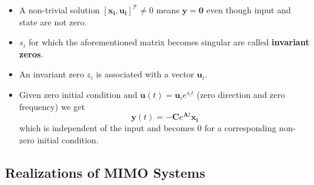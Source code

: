 \begin{itemize}
    \item A non-trivial solution ${\left[\mathbf{x_i}, \mathbf{u_i}\right]}^\mathcal{T}\neq0$ means $\mathbf{\mathbf{y}}=\mathbf{0}$ even though input and state are not zero.
    \item $s_i$ for which the aforementioned matrix becomes singular are called \textbf{invariant zeros}.
    \item An invariant zero $z_i$ is associated with a vector $\mathbf{u}_i$.
    \item Given zero initial condition and $\mathbf{u}(t)=\mathbf{u}_i e^{s_i t}$ (zero direction and zero frequency) we get
          \begin{equation*}
              \mathbf{y}(t)=-\mathbf{C}e^{\mathbf{A}t}\mathbf{x_i}
          \end{equation*} which is independent of the input and becomes $0$ for a corresponding non-zero initial condition.
\end{itemize}


\subsection{Realizations of MIMO Systems}
